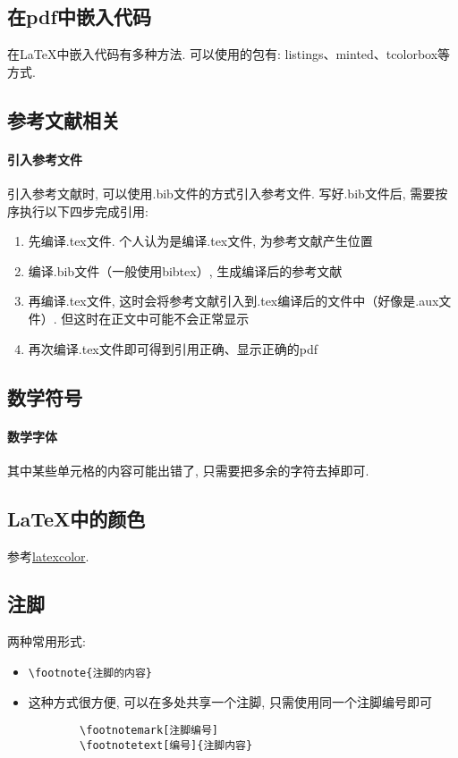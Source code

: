 \subsection{在pdf中嵌入代码}在\LaTeX 中嵌入代码有多种方法. 可以使用的包有: listings、minted、tcolorbox等方式. 

\subsection{参考文献相关}
\paragraph{引入参考文件}引入参考文献时, 可以使用.bib文件的方式引入参考文件. 写好.bib文件后, 需要按序执行以下四步完成引用: 
\begin{enumerate}
	\item 先编译.tex文件. 个人认为是编译.tex文件, 为参考文献产生位置
	\item 编译.bib文件（一般使用bibtex）, 生成编译后的参考文献
	\item 再编译.tex文件, 这时会将参考文献引入到.tex编译后的文件中（好像是.aux文件）. 但这时在正文中可能不会正常显示
	\item 再次编译.tex文件即可得到引用正确、显示正确的pdf
\end{enumerate}

\subsection{数学符号}
\paragraph{数学字体}其中某些单元格的内容可能出错了, 只需要把多余的字符去掉即可. 


\subsection{\LaTeX 中的颜色}
参考\href{http://latexcolor.com/}{latexcolor}. 

\subsection{注脚}
两种常用形式: 
\begin{itemize}
	\item \begin{verbatim}\footnote{注脚的内容}\end{verbatim}
	\item 这种方式很方便, 可以在多处共享一个注脚, 只需使用同一个注脚编号即可
	\begin{verbatim}
		\footnotemark[注脚编号]
		\footnotetext[编号]{注脚内容}
	\end{verbatim}
\end{itemize}

